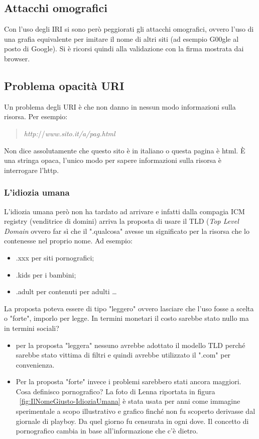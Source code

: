 		\subsection{Attacchi omografici}
			Con l'uso degli IRI si sono però peggiorati gli attacchi omografici, ovvero l'uso di una grafia equivalente per imitare il nome di altri siti (ad esempio G00gle al posto di Google). Si è ricorsi quindi alla validazione con la firma mostrata dai browser.
		
		\subsection{Problema opacità URI}
			Un problema degli URI è che non danno in nessun modo informazioni sulla risorsa. Per esempio:
			\begin{quote}
				\emph{http:}//\emph{www.sito.it/a/pag.html}
			\end{quote}
			Non dice assolutamente che questo sito è in italiano o questa pagina è html. È una stringa opaca, l'unico modo per sapere informazioni sulla risorsa è interrogare l'http.
		
			\subsubsection{L'idiozia umana}
				L'idiozia umana però non ha tardato ad arrivare e infatti dalla compagia ICM registry (venditrice di domini) arriva la proposta di usare il TLD (\emph{Top Level Domain} ovvero far sì che il ".qualcosa" avesse un significato per la risorsa che lo contenesse nel proprio nome. Ad esempio:
				\begin{itemize}
					\item .xxx per siti pornografici;
					\item .kids per i bambini;
					\item .adult per contenuti per adulti \dots
				\end{itemize}
				
				La proposta poteva essere di tipo "leggero" ovvero lasciare  che l'uso fosse a scelta o "forte", imporlo per legge.
				In termini monetari il costo sarebbe stato nullo ma in termini sociali?
				\begin{itemize}[label={}]
					\item per la proposta "leggera" nessuno avrebbe adottato il modello TLD perché sarebbe stato vittima di filtri e quindi avrebbe utilizzato il ".com" per convenienza.
					\item Per la proposta "forte" invece i problemi sarebbero stati ancora maggiori. Cosa definisco pornografico? La foto di Lenna riportata in figura ~\ref{fig:IlNomeGiusto-IdioziaUmana} è stata usata per anni come immagine sperimentale a scopo illustrativo e grafico finché non fu scoperto derivasse dal giornale di playboy. Da quel giorno fu censurata in ogni dove. Il concetto di pornografico cambia in base all'informazione che c'è dietro.
				\end{itemize}
				
